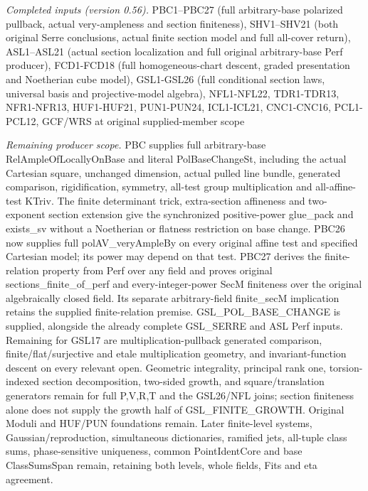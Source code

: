 \emph{Completed inputs (version 0.56).} PBC1–PBC27 (full arbitrary-base polarized pullback, actual very-ampleness and section finiteness), SHV1–SHV21 (both original Serre conclusions, actual finite section model and full all-cover return), ASL1–ASL21 (actual section localization and full original arbitrary-base Perf producer), FCD1-FCD18 (full homogeneous-chart descent, graded presentation and Noetherian cube model), GSL1-GSL26 (full conditional section laws, universal basis and projective-model algebra), NFL1-NFL22, TDR1-TDR13, NFR1-NFR13, HUF1-HUF21, PUN1-PUN24, ICL1-ICL21, CNC1-CNC16, PCL1-PCL12, GCF/WRS at original supplied-member scope

\emph{Remaining producer scope.} PBC supplies full arbitrary-base RelAmpleOfLocallyOnBase and literal PolBaseChangeSt, including the actual Cartesian square, unchanged dimension, actual pulled line bundle, generated comparison, rigidification, symmetry, all-test group multiplication and all-affine-test KTriv. The finite determinant trick, extra-section affineness and two-exponent section extension give the synchronized positive-power glue\_\allowbreak pack and exists\_\allowbreak sv without a Noetherian or flatness restriction on base change. PBC26 now supplies full polAV\_\allowbreak veryAmpleBy on every original affine test and specified Cartesian model; its power may depend on that test. PBC27 derives the finite-relation property from Perf over any field and proves original sections\_\allowbreak finite\_\allowbreak of\_\allowbreak perf and every-integer-power SecM finiteness over the original algebraically closed field. Its separate arbitrary-field finite\_\allowbreak secM implication retains the supplied finite-relation premise. GSL\_\allowbreak POL\_\allowbreak BASE\_\allowbreak CHANGE is supplied, alongside the already complete GSL\_\allowbreak SERRE and ASL Perf inputs. Remaining for GSL17 are multiplication-pullback generated comparison, finite/flat/surjective and etale multiplication geometry, and invariant-function descent on every relevant open. Geometric integrality, principal rank one, torsion-indexed section decomposition, two-sided growth, and square/translation generators remain for full P,V,R,T and the GSL26/NFL joins; section finiteness alone does not supply the growth half of GSL\_\allowbreak FINITE\_\allowbreak GROWTH. Original Moduli and HUF/PUN foundations remain. Later finite-level systems, Gaussian/reproduction, simultaneous dictionaries, ramified jets, all-tuple class sums, phase-sensitive uniqueness, common PointIdentCore and base ClassSumsSpan remain, retaining both levels, whole fields, Fits and eta agreement.




